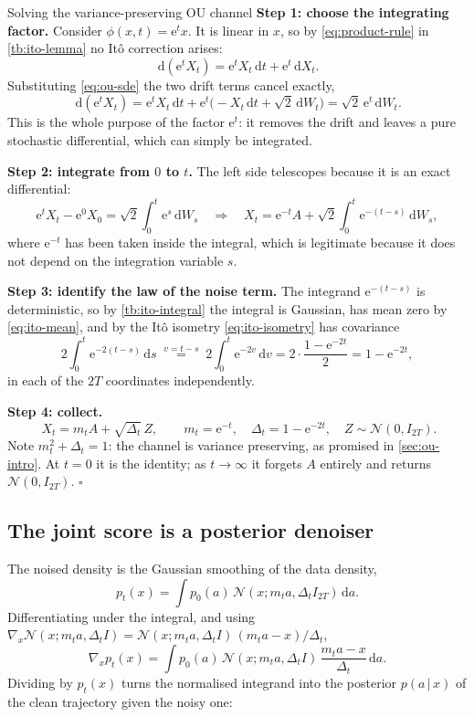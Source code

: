 \documentclass[11pt,a4paper]{article}
\newcommand{\N}{\mathcal{N}}
\newcommand{\given}{\,\vert\,}
\newcommand{\mt}{m_t}
\newcommand{\Dt}{\Delta_t}
\newcommand{\dd}{\,\mathrm d}
\newcommand{\e}{\mathrm e}
\newcounter{toolbox}
\begin{document}
\begin{toolbox}{Solving the variance-preserving OU channel}\label{tb:ou-channel}
\textbf{Step 1: choose the integrating factor.} Consider $\phi(x,t)=\e^tx$. It is linear in
$x$, so by \eqref{eq:product-rule} in \cref{tb:ito-lemma} no It\^o correction arises:
\[
 \dd(\e^tX_t)=\e^tX_t\dd t+\e^t\dd X_t .
\]
Substituting \eqref{eq:ou-sde} the two drift terms cancel exactly,
\begin{equation}
 \dd(\e^tX_t)
 =\e^tX_t\dd t+\e^t\big(-X_t\dd t+\sqrt2\dd W_t\big)
 =\sqrt2\,\e^t\dd W_t .
 \label{eq:ou-exact-differential}
\end{equation}
This is the whole purpose of the factor $\e^t$: it removes the drift and leaves a pure
stochastic differential, which can simply be integrated.

\textbf{Step 2: integrate from $0$ to $t$.} The left side telescopes because it is an exact
differential:
\[
 \e^tX_t-\e^0X_0=\sqrt2\int_0^t\e^s\dd W_s
 \quad\Longrightarrow\quad
 X_t=\e^{-t}A+\sqrt2\int_0^t\e^{-(t-s)}\dd W_s ,
\]
where $\e^{-t}$ has been taken inside the integral, which is legitimate because it does not
depend on the integration variable $s$.

\textbf{Step 3: identify the law of the noise term.} The integrand $\e^{-(t-s)}$ is
deterministic, so by \cref{tb:ito-integral} the integral is Gaussian, has mean zero by
\eqref{eq:ito-mean}, and by the It\^o isometry \eqref{eq:ito-isometry} has covariance
\[
 2\int_0^t\e^{-2(t-s)}\dd s
 \;\overset{v=t-s}{=}\;2\int_0^t\e^{-2v}\dd v
 =2\cdot\frac{1-\e^{-2t}}{2}
 =1-\e^{-2t} ,
\]
in each of the $2T$ coordinates independently.

\textbf{Step 4: collect.}
\begin{equation}
 \boxed{\;X_t=\mt A+\sqrt{\Dt}\,Z,\qquad
 \mt=\e^{-t},\quad \Dt=1-\e^{-2t},\quad Z\sim\N(0,I_{2T}).}
 \label{eq:ou-channel}
\end{equation}
Note $\mt^2+\Dt=1$: the channel is variance preserving, as promised in \cref{sec:ou-intro}. At
$t=0$ it is the identity; as $t\to\infty$ it forgets $A$ entirely and returns $\N(0,I_{2T})$.
\hfill$\square$
\end{toolbox}

\subsection{The joint score is a posterior denoiser}\label{sec:tweedie}

The noised density is the Gaussian smoothing of the data density,
\begin{equation}
 p_t(x)=\int p_0(a)\,\N(x;\mt a,\Dt I_{2T})\dd a .
 \label{eq:noised-density}
\end{equation}
Differentiating under the integral, and using
$\nabla_x\N(x;\mt a,\Dt I)=\N(x;\mt a,\Dt I)\,(\mt a-x)/\Dt$,
\begin{equation}
 \nabla_xp_t(x)=\int p_0(a)\,\N(x;\mt a,\Dt I)\,\frac{\mt a-x}{\Dt}\dd a .
\end{equation}
Dividing by $p_t(x)$ turns the normalised integrand into the posterior $p(a\given x)$ of the
clean trajectory given the noisy one:
\end{document}
